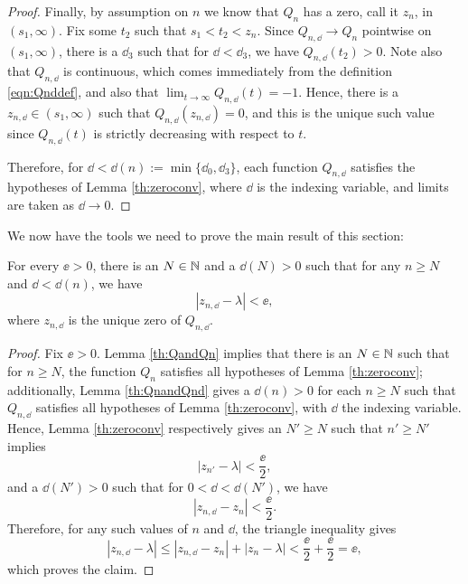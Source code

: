 \begin{proof}
	Finally, by assumption on $n$ we know that $Q_n$ has a zero, call it $z_n$, in $(s_1, \infty)$. Fix some $t_2$ such that $s_1 < t_2 < z_n$. Since $Q_{n, \dd} \to Q_n$ pointwise on $(s_1, \infty)$, there is a $\dd_3$ such that for $\dd < \dd_3$, we have $Q_{n, \dd}(t_2) > 0$. Note also that $Q_{n, \dd}$ is continuous, which comes immediately from the definition \eqref{eqn:Qnddef}, and also that $\lim_{t \to \infty} Q_{n, \dd}(t) = -1$. Hence, there is a $z_{n, \dd} \in (s_1, \infty)$ such that $Q_{n, \dd}(z_{n, \dd}) = 0$, and this is the unique such value since $Q_{n, \dd}(t)$ is strictly decreasing with respect to $t$.
	
	Therefore, for $\dd < \dd(n):= \min\{\dd_0, \dd_3\}$, each function $Q_{n, \dd}$ satisfies the hypotheses of Lemma \ref{th:zeroconv}, where $\dd$ is the indexing variable, and limits are taken as $\dd \to 0$.
\end{proof}

We now have the tools we need to prove the main result of this section:

\begin{theorem}
	For every $\ee>0$, there is an $N \in \mathbb{N}$ and a $\dd(N) >0$ such that for any $n \geq N$ and $\dd < \dd(n)$, we have
	\[|z_{n, \dd} - \lambda | < \ee,\]
	where $z_{n, \dd}$ is the unique zero of $Q_{n, \dd}$.
\end{theorem}

\begin{proof}
	Fix $\ee>0$. Lemma \ref{th:QandQn} implies that there is an $N \in \mathbb{N}$ such that for $n \geq N$, the function $Q_n$ satisfies all hypotheses of Lemma \ref{th:zeroconv}; additionally, Lemma \ref{th:QnandQnd} gives a $\dd(n) > 0$ for each $n \geq N$ such that $Q_{n, \dd}$ satisfies all hypotheses of Lemma \ref{th:zeroconv}, with $\dd$ the indexing variable. Hence, Lemma \ref{th:zeroconv} respectively gives an $N' \geq N$ such that $n' \geq N'$ implies
	\[|z_{n'} - \lambda | < \frac{\ee}{2},\]
	and a $\dd(N') > 0$ such that for $0 < \dd < \dd(N')$, we have
	\[|z_{n, \dd} - z_{n}| < \frac{\ee}{2}.\]
	Therefore, for any such values of $n$ and $\dd$, the triangle inequality gives
	\[|z_{n, \dd} - \lambda| \leq |z_{n, \dd} - z_n| + |z_n - \lambda| < \frac{\ee}{2} + \frac{\ee}{2} = \ee,\]
	which proves the claim.
\end{proof}





